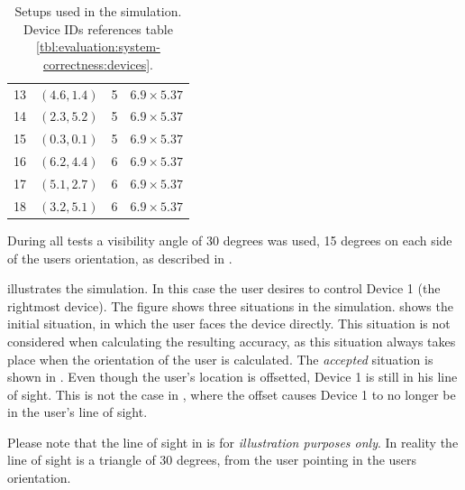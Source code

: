\begin{table}[!hbt]
\begin{tabular}{c|ccc}
	    13      &   $(4.6 , 1.4)$   &             5              &      $6.9 \times 5.37$      \\
	    14      &   $(2.3 , 5.2)$   &             5              &      $6.9 \times 5.37$      \\
	    15      &   $(0.3 , 0.1)$   &             5              &      $6.9 \times 5.37$      \\
	    16      &   $(6.2 , 4.4)$   &             6              &      $6.9 \times 5.37$      \\
	    17      &   $(5.1 , 2.7)$   &             6              &      $6.9 \times 5.37$      \\
	    18      &   $(3.2 , 5.1)$   &             6              &      $6.9 \times 5.37$
\end{tabular}
\caption{Setups used in the simulation. Device IDs references table \ref{tbl:evaluation:system-correctness:devices}.}
\label{lst:evaluation:system-correctness:setups}
\end{table}

During all tests a visibility angle of \num{30} degrees was used, 
\ie \num{15} degrees on each side of the users orientation, 
as described in .

 illustrates the simulation. 
In this case the user desires to control Device 1 (the rightmost device). 
The figure shows three situations in the simulation. 
 shows the initial situation, 
in which the user faces the device directly. 
This situation is not considered when calculating the resulting accuracy, 
as this situation always takes place when the orientation of the user is calculated. 
The \emph{accepted} situation is shown in . 
Even though the user's location is offsetted, 
Device 1 is still in his line of sight. 
This is not the case in , 
where the offset causes Device 1 to no longer be in the user's line of sight.

Please note that the line of sight in  is for \emph{illustration purposes only}. 
In reality the line of sight is a triangle of \num{30} degrees, 
from the user pointing in the users orientation.

